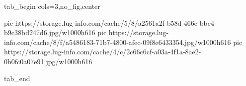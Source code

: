 
 
 
 
 


\ifcmt
  tab_begin cols=3,no_fig,center

     pic https://storage.lug-info.com/cache/5/8/a2561a2f-b58d-466e-bbe4-b9c38bd247d6.jpg/w1000h616
		 pic https://storage.lug-info.com/cache/8/f/a5486183-71b7-4800-afec-09f8e6433354.jpg/w1000h616
		 pic https://storage.lug-info.com/cache/4/c/2c66c6cf-a03a-4f1a-8ae2-0b0fc0a07e91.jpg/w1000h616

  tab_end
\fi
